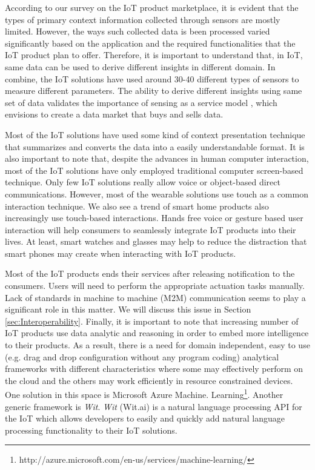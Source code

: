 \documentclass[journal]{IEEEtran}
\begin{document}
According to our survey on the IoT product marketplace, it is evident that the types of primary context information collected through sensors are mostly limited. However, the ways such collected data is been processed  varied significantly based on the application and the required functionalities that the IoT product plan to offer. Therefore, it is important to understand that, in IoT, same data can be used to derive different insights in different domain. In combine, the IoT solutions have used around 30-40 different types of sensors to measure different parameters. The ability to derive different insights using same set of data validates the importance of sensing as a service model \cite{ZMP008}, which envisions to create a data market that buys and sells data. 

Most of the IoT solutions have used some kind of context presentation technique that summarizes and converts the data into a easily understandable format. It is also important to note that, despite the advances in human computer interaction, most of the IoT solutions have only employed traditional computer screen-based technique. Only few IoT solutions really allow voice or object-based direct communications. However, most of the wearable solutions use touch as a common interaction technique. We also see a trend of smart home products also increasingly use touch-based interactions. Hands free voice or gesture based user interaction will help consumers to seamlessly integrate IoT products into their lives. At least, smart watches and glasses may help to reduce the distraction that smart phones may create when interacting with IoT products.

Most of the IoT products ends their services after releasing notification to the consumers. Users will need to perform the appropriate actuation tasks manually. Lack of standards in machine to machine (M2M) communication seems to play a significant role in this matter. We will discuss this issue in Section \ref{sec:Interoperability}. Finally, it is important to note that increasing number of IoT products use data analytic and reasoning in order to embed more intelligence to their products. As a result, there is a need for domain independent, easy to use (e.g. drag and drop configuration without any program coding) analytical frameworks with different characteristics where some may  effectively  perform on the cloud and the others may work efficiently in resource constrained devices. One solution in this space is Microsoft Azure Machine. Learning\footnote{http://azure.microsoft.com/en-us/services/machine-learning/}. Another generic framework is \textit{Wit}. \textit{Wit} (Wit.ai) is a  natural language processing API for the IoT which allows developers to easily and quickly  add natural language processing functionality to their IoT solutions.
 
\end{document}

